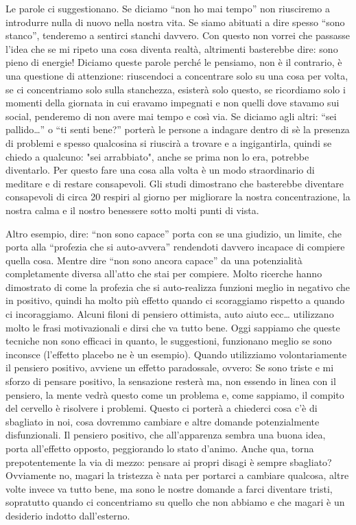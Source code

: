 \documentclass[12pt]{book} %
\begin{document}
Le parole ci suggestionano. Se diciamo “non ho mai tempo” non riusciremo a introdurre nulla di nuovo nella nostra vita.
Se siamo abituati a dire spesso “sono stanco”, tenderemo a sentirci stanchi davvero. Con questo non vorrei che passasse l'idea che se mi ripeto una cosa diventa realtà, altrimenti basterebbe dire: sono pieno di energie! Diciamo queste parole perché le pensiamo, non è il contrario, è una questione di attenzione: riuscendoci a concentrare solo su una cosa per volta, se ci concentriamo solo sulla stanchezza, esisterà solo questo, se ricordiamo solo i momenti della giornata in cui eravamo impegnati e non quelli dove stavamo sui social, penderemo di non avere mai tempo e così via. Se diciamo agli altri: “sei pallido…” o “ti senti bene?” porterà le persone a indagare dentro di sè la presenza di problemi e spesso qualcosina si riuscirà a trovare e a ingigantirla, quindi se chiedo a qualcuno: "sei arrabbiato", anche se prima non lo era, potrebbe diventarlo. Per questo fare una cosa alla volta è un modo straordinario di meditare e di restare consapevoli. Gli studi dimostrano che basterebbe diventare consapevoli di circa 20 respiri al giorno per migliorare la nostra concentrazione, la nostra calma e il nostro benessere sotto molti punti di vista.

Altro esempio, dire: “non sono capace” porta con se una giudizio, un limite, che porta alla “profezia che si
auto-avvera” rendendoti davvero incapace di compiere quella cosa. Mentre dire “non sono ancora capace” da una
potenzialità completamente diversa all'atto che stai per compiere. Molto ricerche hanno dimostrato di come la profezia
che si auto-realizza funzioni meglio in negativo che in positivo, quindi ha molto più effetto quando ci scoraggiamo
rispetto a quando ci incoraggiamo. Alcuni filoni di pensiero ottimista, auto aiuto ecc… utilizzano molto le frasi
motivazionali e dirsi che va tutto bene. Oggi sappiamo che queste tecniche non sono efficaci in quanto, le suggestioni,
funzionano meglio se sono inconsce (l'effetto placebo ne è un esempio). Quando utilizziamo
volontariamente il pensiero positivo, avviene un effetto paradossale, ovvero: Se sono triste e mi sforzo di pensare
positivo, la sensazione resterà ma, non essendo in linea con il pensiero, la mente vedrà questo come un problema e,
come sappiamo, il compito del cervello è risolvere i problemi. Questo ci porterà a chiederci cosa
c'è di sbagliato in noi, cosa dovremmo cambiare e altre domande potenzialmente disfunzionali. Il
pensiero positivo, che all'apparenza sembra una buona idea, porta all'effetto
opposto, peggiorando lo stato d'animo. Anche qua, torna prepotentemente la via di mezzo: pensare
ai propri disagi è sempre sbagliato? Ovviamente no, magari la tristezza è nata per portarci a cambiare qualcosa, altre
volte invece va tutto bene, ma sono le nostre domande a farci diventare tristi, sopratutto quando ci concentriamo su
quello che non abbiamo e che magari è un desiderio indotto dall'esterno.
\end{document}
